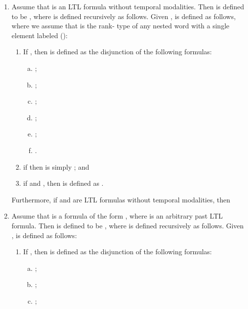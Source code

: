 \documentclass{LMCS}
\theoremstyle{plain}
\theoremstyle{definition}
\begin{document}
{\begin{enumerate}[] 

\item Assume that  is an LTL formula without temporal
  modalities. Then  is defined to be
  , where  is defined recursively as
  follows. Given ,  is defined as follows, where we assume that 
is the rank- type of any nested word with a single element labeled
 (): 
\begin{enumerate}[(1)]
\item If , then  is defined as the
  disjunction of the following formulas: \begin{enumerate}[(a)] 

\item
  ;

\item ; 

\item
    ; 

\item ; 

\item ; 

\item
    .
    
\end{enumerate} 

\item if  then
     is simply ; and 

\item if  and , then  is
    defined as .
    \end{enumerate}

Furthermore, if  and  are
LTL formulas without temporal modalities, then 

\item Assume that  is a formula of the form , where  is an arbitrary past LTL formula. Then
 is defined to be , where  is defined recursively as follows. Given ,  is defined as 
follows: 

\begin{enumerate}[(1)] 

\item If , then
 is defined as the disjunction of the following formulas:

\begin{enumerate}[(a)] 

\item ; 

\item ; 

\item ;


\end{enumerate}
\end{enumerate}
\end{enumerate}}
\end{document}

